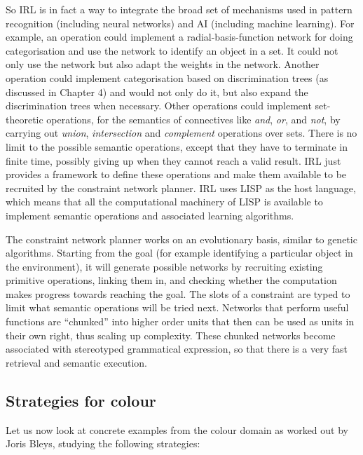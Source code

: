 So IRL is in fact a way to integrate the broad set of mechanisms used in 
pattern recognition (including neural networks) and AI (including machine learning). 
For example, an operation could implement a radial-basis-function network for doing categorisation and 
use the network to identify an object in a set. It could not only use the network but also adapt 
the weights in the network. Another operation could implement categorisation based 
on discrimination trees (as discussed in Chapter 4) and would not only do it, but also expand the discrimination trees 
when necessary. Other operations could implement set-theoretic operations, 
for the semantics of connectives like {\itshape and}, {\itshape or}, and {\itshape not}, by carrying out
{\itshape union}, {\itshape intersection} and {\itshape complement} operations over sets. There is no 
limit to the possible semantic operations, except that they have to terminate in finite time, possibly giving up when 
they cannot reach a valid result. IRL just provides a framework to define these operations and make them available 
to be recruited by the constraint network planner. IRL uses LISP as the host language, which means that all 
the computational machinery of LISP is available to implement semantic operations and associated learning algorithms. 

The constraint network planner works on an evolutionary basis, similar to genetic algorithms. Starting from the goal 
(for example identifying a particular object in the environment), it will generate possible networks by recruiting 
existing primitive operations, linking them in, and checking whether the computation makes progress towards reaching the goal. 
The slots of a constraint are typed to limit what semantic operations will be tried next. Networks that perform useful 
functions are ``chunked'' into higher order units that then can be used as units in their own right, thus scaling up 
complexity. These chunked networks become associated with stereotyped grammatical expression, so that there is a very 
fast retrieval and semantic execution.
\subsection{Strategies for colour}

Let us now look at concrete examples from the colour domain as worked out by Joris Bleys, studying the following 
strategies: 

